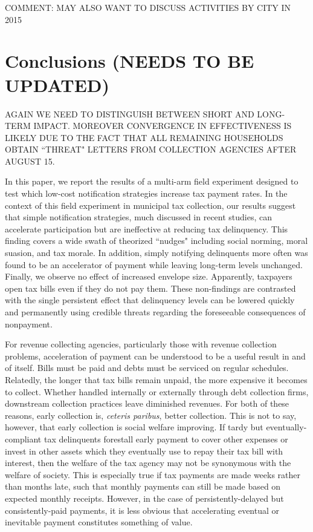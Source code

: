 \documentclass[12pt]{article}
\begin{document}
\noindent COMMENT: MAY ALSO WANT TO DISCUSS ACTIVITIES BY CITY IN 2015


\section{Conclusions (NEEDS TO BE UPDATED)}

\noindent AGAIN WE NEED TO DISTINGUISH BETWEEN SHORT AND LONG-TERM
IMPACT. MOREOVER CONVERGENCE IN EFFECTIVENESS IS LIKELY DUE TO THE
FACT THAT ALL REMAINING HOUSEHOLDS OBTAIN ``THREAT" LETTERS FROM
COLLECTION AGENCIES AFTER AUGUST 15.

In this paper, we report the results of a multi-arm field experiment 
designed to test which low-cost notification strategies increase tax 
payment rates. In the context of this field experiment in municipal 
tax collection, our results suggest that simple notification strategies, 
much discussed in recent studies, can accelerate participation but are 
ineffective at reducing tax delinquency. This finding covers a 
wide swath of theorized  ``nudges" including social norming, moral suasion, 
and tax morale. In addition, simply notifying delinquents more often was 
found to be an accelerator of payment while leaving long-term levels 
unchanged. Finally, we observe no effect of increased envelope size. 
Apparently, taxpayers open tax bills even if they do not pay them.
These non-findings are contrasted with the single persistent effect 
that delinquency levels can be lowered quickly and permanently using 
credible threats regarding the foreseeable consequences of nonpayment. 

For revenue collecting agencies, particularly those with revenue collection 
problems, acceleration of payment can be understood to be a useful result 
in and of itself. Bills must be paid and debts must be serviced on regular 
schedules. Relatedly, the longer that tax bills remain unpaid, the more 
expensive it becomes to collect. Whether handled internally or externally 
through debt collection firms, downstream collection practices leave 
diminished revenues. For both of these reasons, early collection is, 
\textit{ceteris paribus}, better collection. This is not to say, 
however, that early collection is social welfare improving. If tardy 
but eventually-compliant tax delinquents forestall early payment to 
cover other expenses or invest in other assets which they eventually 
use to repay their tax bill with interest, then the welfare of the tax 
agency may not be synonymous with the welfare of society. This is 
especially true if tax payments are made weeks rather than months late, 
such that monthly payments can still be made based on expected monthly 
receipts. However, in the case of persistently-delayed but consistently-paid 
payments, it is less obvious that accelerating eventual or inevitable 
payment constitutes something of value. 
\end{document}
